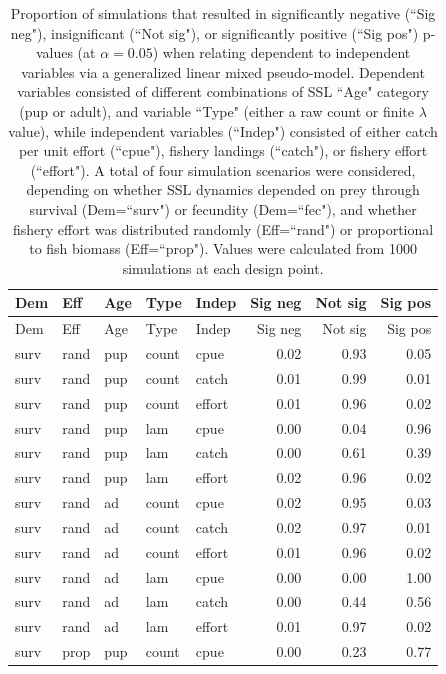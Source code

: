 \documentclass[nonumbib,leqno]{nrc1}
\begin{document}
\begin{longtable}{lllllrrr}
\caption[Sim1]{ \large Proportion of simulations that resulted in significantly negative (``Sig neg"), insignificant (``Not sig"), or significantly positive (``Sig pos") p-values (at $\alpha=0.05$) when relating dependent to independent variables via a generalized linear mixed pseudo-model.  Dependent variables consisted of different combinations of SSL ``Age" category (pup or adult), and variable ``Type" (either a raw count or finite $\lambda$ value), while independent variables (``Indep") consisted of either catch per unit effort (``cpue"), fishery landings (``catch"), or fishery effort (``effort").  A total of four simulation scenarios were considered, depending on whether SSL dynamics depended on prey through survival (Dem=``surv") or fecundity (Dem=``fec"), and whether fishery effort was distributed randomly (Eff=``rand") or proportional to fish biomass (Eff=``prop").  Values were calculated from 1000 simulations at each design point.}
\label{tab:sim1} \\
\hline \hline
Dem & Eff & Age & Type & Indep & Sig neg & Not sig & Sig pos \\
  \hline
\endfirsthead
\hline \hline
Dem & Eff & Age & Type & Indep & Sig neg & Not sig & Sig pos \\
  \hline
\endhead
\hline
\endfoot
\hline
\endlastfoot
surv & rand & pup & count & cpue & 0.02 & 0.93 & 0.05 \\
  surv & rand & pup & count & catch & 0.01 & 0.99 & 0.01 \\
  surv & rand & pup & count & effort & 0.01 & 0.96 & 0.02 \\
  surv & rand & pup & lam & cpue & 0.00 & 0.04 & 0.96 \\
  surv & rand & pup & lam & catch & 0.00 & 0.61 & 0.39 \\
  surv & rand & pup & lam & effort & 0.02 & 0.96 & 0.02 \\
  surv & rand & ad & count & cpue & 0.02 & 0.95 & 0.03 \\
  surv & rand & ad & count & catch & 0.02 & 0.97 & 0.01 \\
  surv & rand & ad & count & effort & 0.01 & 0.96 & 0.02 \\
  surv & rand & ad & lam & cpue & 0.00 & 0.00 & 1.00 \\
  surv & rand & ad & lam & catch & 0.00 & 0.44 & 0.56 \\
  surv & rand & ad & lam & effort & 0.01 & 0.97 & 0.02 \\
  surv & prop & pup & count & cpue & 0.00 & 0.23 & 0.77 \\

\end{longtable}
\end{document}
